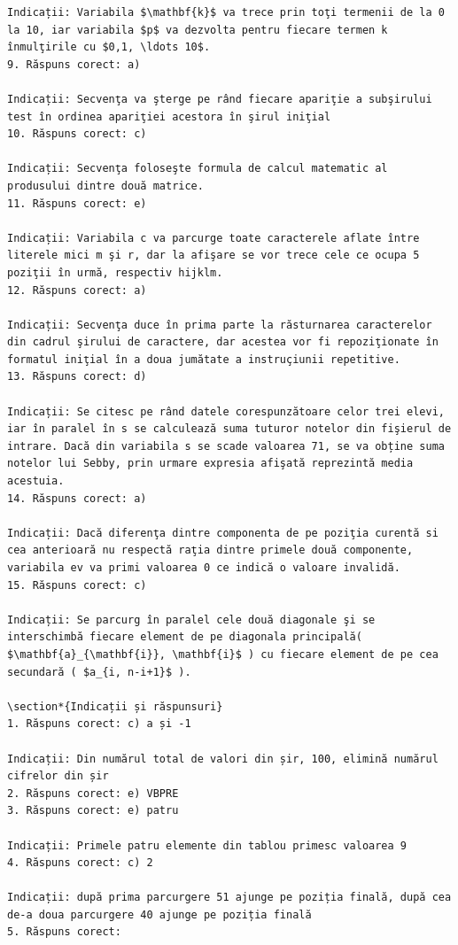 \documentclass[10pt]{article}
\begin{document}
\begin{verbatim}
Indicații: Variabila $\mathbf{k}$ va trece prin toţi termenii de la 0 la 10, iar variabila $p$ va dezvolta pentru fiecare termen k înmulţirile cu $0,1, \ldots 10$.
9. Răspuns corect: a)

Indicații: Secvenţa va şterge pe rând fiecare apariţie a subşirului test în ordinea apariţiei acestora în şirul iniţial
10. Răspuns corect: c)

Indicații: Secvenţa foloseşte formula de calcul matematic al produsului dintre două matrice.
11. Răspuns corect: e)

Indicații: Variabila c va parcurge toate caracterele aflate între literele mici m şi r, dar la afişare se vor trece cele ce ocupa 5 poziţii în urmă, respectiv hijklm.
12. Răspuns corect: a)

Indicații: Secvenţa duce în prima parte la răsturnarea caracterelor din cadrul şirului de caractere, dar acestea vor fi repoziţionate în formatul iniţial în a doua jumătate a instruçiunii repetitive.
13. Răspuns corect: d)

Indicații: Se citesc pe rând datele corespunzătoare celor trei elevi, iar în paralel în s se calculează suma tuturor notelor din fişierul de intrare. Dacă din variabila s se scade valoarea 71, se va obține suma notelor lui Sebby, prin urmare expresia afişată reprezintă media acestuia.
14. Răspuns corect: a)

Indicații: Dacă diferenţa dintre componenta de pe poziţia curentă si cea anterioară nu respectă raţia dintre primele două componente, variabila ev va primi valoarea 0 ce indică o valoare invalidă.
15. Răspuns corect: c)

Indicații: Se parcurg în paralel cele două diagonale şi se interschimbă fiecare element de pe diagonala principală( $\mathbf{a}_{\mathbf{i}}, \mathbf{i}$ ) cu fiecare element de pe cea secundară ( $a_{i, n-i+1}$ ).

\section*{Indicații și răspunsuri}
1. Răspuns corect: c) a și -1

Indicații: Din numărul total de valori din șir, 100, elimină numărul cifrelor din șir
2. Răspuns corect: e) VBPRE
3. Răspuns corect: e) patru

Indicații: Primele patru elemente din tablou primesc valoarea 9
4. Răspuns corect: c) 2

Indicații: după prima parcurgere 51 ajunge pe poziția finală, după cea de-a doua parcurgere 40 ajunge pe poziția finală
5. Răspuns corect:


\end{verbatim}
\end{document}
